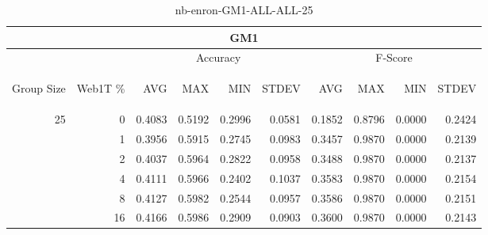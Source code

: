 \begin{center}
\begin{table}[htbp] 
 \begin{center}
\begin{tabular}{ | r | r | r | r | r | r | r | r | r | r |}
\hline
\multicolumn{10}{|c|}{GM1}\\
\hline
 & & \multicolumn{4}{|c|}{Accuracy} & \multicolumn{4}{|c|}{F-Score}\\ \cline{3-10}
\begin{sideways}Group Size\end{sideways} & \begin{sideways}Web1T \%\end{sideways} & \begin{sideways}AVG\end{sideways} & \begin{sideways}MAX\end{sideways} & \begin{sideways}MIN\end{sideways} & \begin{sideways}STDEV\end{sideways} & \begin{sideways}AVG\end{sideways} & \begin{sideways}MAX\end{sideways} & \begin{sideways}MIN\end{sideways} & \begin{sideways}STDEV\end{sideways}\\
\hline
\multirow{5}{*}{25}
 & 0 & 0.4083 & 0.5192 & 0.2996 & 0.0581 & 0.1852 & 0.8796 & 0.0000 & 0.2424\\ \cline{2-10}
 & 1 & 0.3956 & 0.5915 & 0.2745 & 0.0983 & 0.3457 & 0.9870 & 0.0000 & 0.2139\\ \cline{2-10}
 & 2 & 0.4037 & 0.5964 & 0.2822 & 0.0958 & 0.3488 & 0.9870 & 0.0000 & 0.2137\\ \cline{2-10}
 & 4 & 0.4111 & 0.5966 & 0.2402 & 0.1037 & 0.3583 & 0.9870 & 0.0000 & 0.2154\\ \cline{2-10}
 & 8 & 0.4127 & 0.5982 & 0.2544 & 0.0957 & 0.3586 & 0.9870 & 0.0000 & 0.2151\\ \cline{2-10}
 & 16 & 0.4166 & 0.5986 & 0.2909 & 0.0903 & 0.3600 & 0.9870 & 0.0000 & 0.2143\\ \cline{2-10}
\hline
\end{tabular}
\caption{nb-enron-GM1-ALL-ALL-25}
\label{table:nb-enron-GM1-ALL-ALL-25}
\end{center}
 \end{table}
\end{center}

